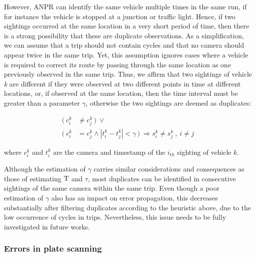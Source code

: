 However, ANPR can identify the same vehicle multiple times in the same run, if for instance the vehicle is stopped at a junction or traffic light. Hence, if two sightings occurred at the same location in a very short period of time, then there is a strong possibility that these are duplicate observations. As a simplification, we can assume that a trip should not contain cycles and that no camera should appear twice in the same trip. Yet, this assumption ignores cases where a vehicle is required to correct its route by passing through the same location as one previously observed in the same trip. Thus, we affirm that two sightings of vehicle \emph{k} are different if they were observed at two different points in time at different locations, or, if observed at the same location, then the time interval must be greater than a parameter $\gamma$, otherwise the two sightings are deemed as duplicates:


\begin{align} \label{e.sighting.different.2}
 (\ c^{k}_{i} &\ne c^{k}_{j} \, )\ \vee \\
 (\ c^{k}_{i} &= c^{k}_{j} \wedge |t^{k}_{i} - t^{k}_{j}| < \gamma \, )\ \Rightarrow s^{k}_{i} \ne s^{k}_{j}  \ , \ i \ne j \nonumber
\end{align}

where $c_i^k$ and $t_i^k$ are the camera and timestamp of the $i_{th}$ sighting of vehicle $k$.

 Although the estimation of $\gamma$ carries similar considerations and consequences as those of estimating $\mathrm{T}$ and $\tau$, most duplicates can be identified in consecutive sightings of the same camera within the same trip. Even though a poor estimation of $\gamma$ also has an impact on error propagation, this decreases substantially after filtering duplicates according to the heuristic above, due to the low occurrence of cycles in trips. Nevertheless, this issue needs to be fully investigated in future works.

\subsubsection*{Errors in plate scanning}


